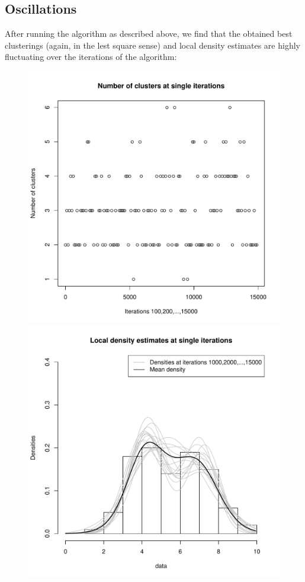 \subsection{Oscillations}
After running the algorithm as described above, we find that the obtained best clusterings (again, in the lest square sense) and local density estimates are highly fluctuating over the iterations of the algorithm:
\begin{figure}[h]
	\centering
	\begin{minipage}{0.5\textwidth}
		\includegraphics[scale=0.35]{etc/cardinalities_thinned.pdf}
	\end{minipage}%
	\begin{minipage}{0.5\textwidth}
		\includegraphics[scale=0.35]{etc/densities_iters.pdf}
	\end{minipage}
\end{figure}

